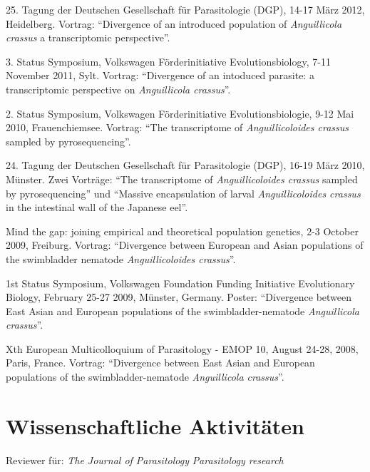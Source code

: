 \documentclass[10pt,a4paper]{article}
\renewenvironment{itemize}{
  \begin{list}{}{
    \setlength{\leftmargin}{2.5em}
    \setlength{\itemsep}{0.25em}
    \setlength{\parskip}{0pt}
    \setlength{\parsep}{0.25em}
  }
}{
  \end{list}
}
\begin{document}
\begin{itemize}

\item 25. Tagung der Deutschen Gesellschaft f\"ur
  Parasitologie (DGP), 14-17 M\"arz 2012, Heidelberg. Vortrag:
  ``Divergence of an introduced population of \textit{Anguillicola
    crassus} a transcriptomic perspective''.

\item 3. Status Symposium, Volkswagen F\"orderinitiative
  Evolutionsbiology, 7-11 November 2011, Sylt. Vortrag: ``Divergence
  of an intoduced parasite: a transcriptomic perspective on
  \textit{Anguillicola crassus}''.

\item 2. Status Symposium, Volkswagen F\"orderinitiative
  Evolutionsbiologie, 9-12 Mai 2010, Frauenchiemsee. Vortrag: ``The
  transcriptome of \textit{Anguillicoloides crassus} sampled by
  pyrosequencing''.

\item 24. Tagung der Deutschen Gesellschaft f\"ur Parasitologie (DGP),
  16-19 M\"arz 2010, M\"unster. Zwei Vortr\"age: ``The transcriptome
  of \textit{Anguillicoloides crassus} sampled by pyrosequencing'' und
  ``Massive encapsulation of larval \textit{Anguillicoloides crassus}
  in the intestinal wall of the Japanese eel''.

\item Mind the gap: joining empirical and theoretical population
  genetics, 2-3 October 2009, Freiburg. Vortrag: ``Divergence between
  European and Asian populations of the swimbladder nematode
  \textit{Anguillicoloides crassus}''.

\item 1st Status Symposium, Volkswagen Foundation Funding Initiative
  Evolutionary Biology, February 25-27 2009, M\"unster,
  Germany. Poster: ``Divergence between East Asian and European
  populations of the swimbladder-nematode \textit{Anguillicola
    crassus}''.

\item Xth European Multicolloquium of Parasitology - EMOP 10, August
  24-28, 2008, Paris, France. Vortrag: ``Divergence between
  East Asian and European populations of the swimbladder-nematode
  \textit{Anguillicola crassus}''.

\end{itemize}

\section*{Wissenschaftliche Aktivit\"aten}
\begin{itemize}
\item Reviewer f\"ur:\newline
  \textit{The Journal of Parasitology}\newline
  \textit{Parasitology research}
\end{itemize}
\end{document}
